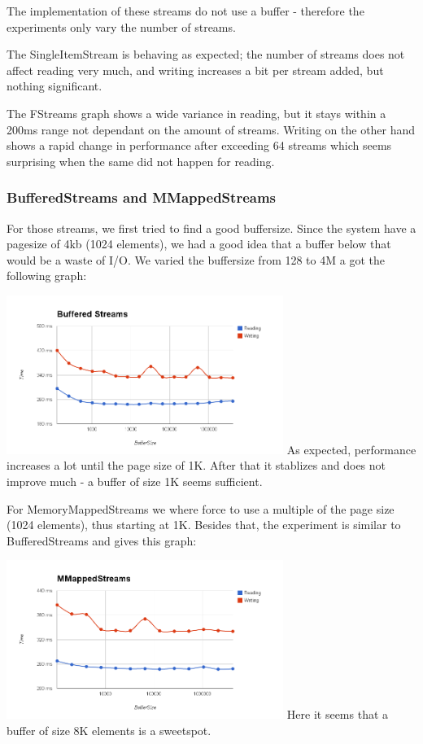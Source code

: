 The implementation of these streams do not use a buffer - therefore the experiments only vary the number of streams.

The SingleItemStream is behaving as expected; the number of streams does not affect reading very much, and writing increases a bit per stream added, but nothing significant. 


The FStreams graph shows a wide variance in reading, but it stays within a 200ms range not dependant on the amount of streams. Writing on the other hand shows a rapid change in performance after exceeding 64 streams which seems surprising when the same did not happen for reading. 

\subsubsection{BufferedStreams and MMappedStreams}
For those streams, we first tried to find a good buffersize. Since the system have a pagesize of 4kb (1024 elements), we had a good idea that a buffer below that would be a waste of I/O. We varied the buffersize from 128 to 4M a got the following graph:

\includegraphics[width=90mm]{graphics/buffer_BS.png}
As expected, performance increases a lot until the page size of 1K. After that it stablizes and does not improve much - a buffer of size 1K seems sufficient.

For MemoryMappedStreams we where force to use a multiple of the page size (1024 elements), thus starting at 1K. Besides that, the experiment is similar to BufferedStreams and gives this graph:

\includegraphics[width=90mm]{graphics/buffer_MMS.png}
Here it seems that a buffer of size 8K elements is a sweetspot.


